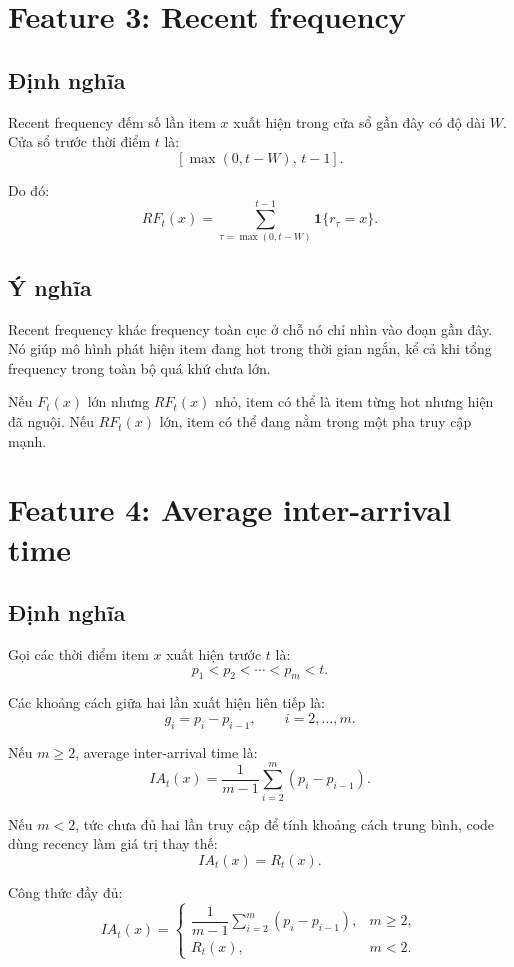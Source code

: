 \documentclass[11pt,a4paper]{article}
\newcommand{\ind}[1]{\mathbf{1}\{#1\}}
\begin{document}
\section{Feature 3: Recent frequency}

\subsection{Định nghĩa}

Recent frequency đếm số lần item \(x\) xuất hiện trong cửa sổ gần đây có độ dài \(W\). Cửa sổ trước thời điểm \(t\) là:
\[
    [\max(0,t-W),\,t-1].
\]

Do đó:
\[
    RF_t(x)
    =
    \sum_{\tau=\max(0,t-W)}^{t-1}
    \ind{r_{\tau}=x}.
\]

\subsection{Ý nghĩa}

Recent frequency khác frequency toàn cục ở chỗ nó chỉ nhìn vào đoạn gần đây. Nó giúp mô hình phát hiện item đang hot trong thời gian ngắn, kể cả khi tổng frequency trong toàn bộ quá khứ chưa lớn.

Nếu \(F_t(x)\) lớn nhưng \(RF_t(x)\) nhỏ, item có thể là item từng hot nhưng hiện đã nguội. Nếu \(RF_t(x)\) lớn, item có thể đang nằm trong một pha truy cập mạnh.

\section{Feature 4: Average inter-arrival time}

\subsection{Định nghĩa}

Gọi các thời điểm item \(x\) xuất hiện trước \(t\) là:
\[
    p_1 < p_2 < \cdots < p_m < t.
\]

Các khoảng cách giữa hai lần xuất hiện liên tiếp là:
\[
    g_i = p_i - p_{i-1}, \qquad i=2,\ldots,m.
\]

Nếu \(m\ge 2\), average inter-arrival time là:
\[
    IA_t(x)
    =
    \frac{1}{m-1}
    \sum_{i=2}^{m}
    (p_i-p_{i-1}).
\]

Nếu \(m<2\), tức chưa đủ hai lần truy cập để tính khoảng cách trung bình, code dùng recency làm giá trị thay thế:
\[
    IA_t(x) = R_t(x).
\]

Công thức đầy đủ:
\[
    IA_t(x)
    =
    \begin{cases}
        \dfrac{1}{m-1}\displaystyle\sum_{i=2}^{m}(p_i-p_{i-1}), & m\ge 2,\\[1.2em]
        R_t(x), & m<2.
    \end{cases}
\]
\end{document}
